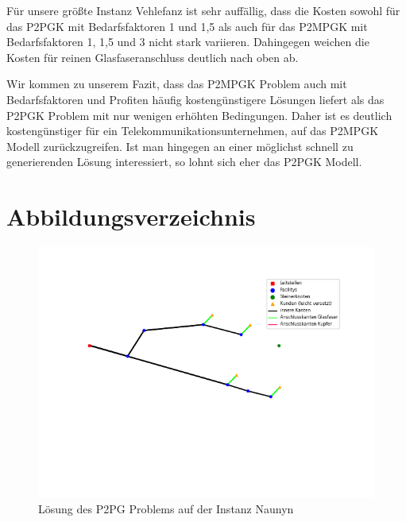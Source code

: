 \documentclass[11pt,a4paper]{article}
\theoremstyle{my_th_style1}
\begin{document}
F\"ur unsere gr\"oßte Instanz Vehlefanz ist sehr auff\"allig, dass die Kosten sowohl f\"ur das P2PGK mit Bedarfsfaktoren 1 und 1,5 als auch f\"ur das P2MPGK mit Bedarfsfaktoren 1, 1,5 und 3 nicht stark variieren.
Dahingegen weichen die Kosten f\"ur reinen Glasfaseranschluss deutlich nach oben ab.

Wir kommen zu unserem Fazit, dass das P2MPGK Problem auch mit Bedarfsfaktoren und Profiten h\"aufig kosteng\"unstigere L\"osungen liefert als das P2PGK Problem mit nur wenigen erh\"ohten Bedingungen.
Daher ist es deutlich kosteng\"unstiger f\"ur ein Telekommunikationsunternehmen, auf das P2MPGK Modell zur\"uckzugreifen.
Ist man hingegen an einer m\"oglichst schnell zu generierenden L\"osung interessiert, so lohnt sich eher das P2PGK Modell.
\newpage

\renewcommand{\refname}{Literaturverzeichnis}

\thispagestyle{empty}
\newpage
\appendix
\section*{Abbildungsverzeichnis}

\begin{figure}[!htbp]
	\begin{center}
		\begin{minipage}{10.0cm}
			\includegraphics[width=1\textwidth]{./Bilder/P2PG_Naunyn}
			\caption{Lösung des P2PG Problems auf der Instanz Naunyn}
			\label{fig:p2pg n pic}
		\end{minipage}
	\end{center}
\end{figure}
\end{document}
